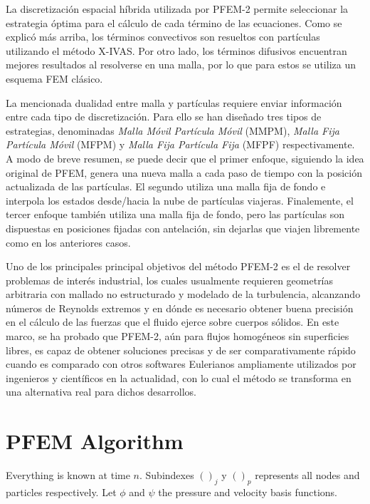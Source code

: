 \documentclass[a4paper,conference]{IEEEtran}
\begin{document}
La discretización espacial híbrida utilizada por PFEM-2 permite seleccionar la estrategia óptima para el cálculo de cada término de las ecuaciones. Como se explicó más arriba, los términos convectivos son resueltos con partículas utilizando el método X-IVAS. Por otro lado, los términos difusivos encuentran mejores resultados al resolverse en una malla, por lo que para estos se utiliza un esquema FEM clásico.

La mencionada dualidad entre malla y partículas requiere enviar información entre cada tipo de discretización. Para ello se han diseñado tres tipos de estrategias, denominadas \textit{Malla Móvil Partícula Móvil} (MMPM), \textit{Malla Fija Partícula Móvil} (MFPM) y \textit{Malla Fija Partícula Fija} (MFPF) respectivamente. A modo de breve resumen, se puede decir que el primer enfoque, siguiendo la idea original de PFEM, genera una nueva malla a cada paso de tiempo con la posición actualizada de las partículas. El segundo  utiliza una malla fija de fondo e interpola los estados desde/hacia la nube de partículas viajeras. Finalemente, el tercer enfoque también utiliza una malla fija de fondo, pero las partículas son dispuestas en posiciones fijadas con antelación, sin dejarlas que viajen libremente como en los anteriores casos.

Uno de los principales principal objetivos del método PFEM-2 es el de resolver problemas de interés industrial, los cuales usualmente requieren geometrías arbitraria con mallado no estructurado y modelado de la turbulencia, alcanzando números de Reynolds extremos y en dónde es necesario obtener buena precisión en el cálculo de las fuerzas que el fluido ejerce sobre cuerpos sólidos. En este marco, se ha probado que PFEM-2, aún para flujos homogéneos sin superficies libres, es capaz de obtener soluciones precisas y de ser comparativamente rápido cuando es comparado con otros softwares Eulerianos ampliamente utilizados por ingenieros y científicos en la actualidad, con lo cual el método se transforma en una alternativa real para dichos desarrollos.




\section{PFEM Algorithm}

Everything is known at time $n$. Subindexes $()_j$ y $()_p$ represents all nodes and particles respectively. Let $\phi$ and $\psi$ the pressure and velocity basis functions.
\end{document}
